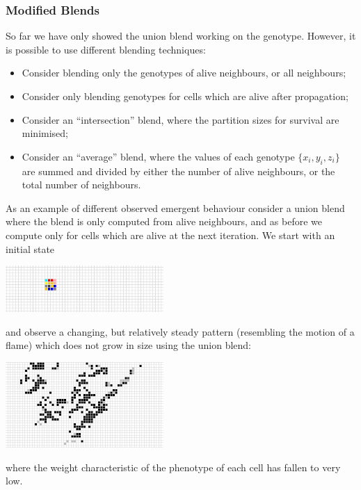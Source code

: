 \documentclass{AISB2008}
\begin{document}
\subsubsection{Modified Blends}

So far we have only showed the union blend working on the genotype. However, it is possible to use different blending techniques:
\begin{itemize}
\item{Consider blending only the genotypes of alive neighbours, or all neighbours;}
\item{Consider only blending genotypes for cells which are alive after propagation;}
\item{Consider an ``intersection'' blend, where the partition sizes for survival are minimised;}
\item{Consider an ``average'' blend, where the values of each genotype $\{x_i,y_i,z_i\}$ are summed and divided by either the number of alive neighbours, or the total number of neighbours.}
\end{itemize}
As an example of different observed emergent behaviour consider a union blend where the blend is only computed from alive neighbours, and as before we compute only for cells which are alive at the next iteration. We start with an initial state
 \begin{center}
 \includegraphics[width=0.45\textwidth]{init2.jpg}
 \end{center}
and observe a changing, but relatively steady pattern (resembling the motion of a flame) which does not grow in size using the union blend:
 \begin{center}
 \includegraphics[width=0.45\textwidth]{init2_union.jpg}
 \end{center}
\noindent where the weight characteristic of the phenotype of each cell has fallen to very low.
\end{document}
